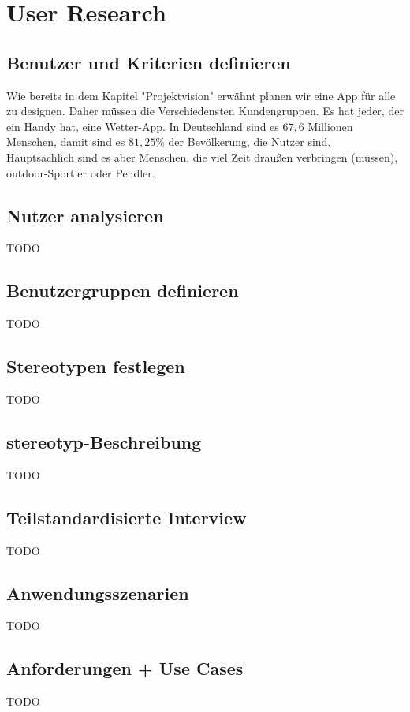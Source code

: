 \documentclass[12pt,a4paper]{scrartcl}
\begin{document}
\section{User Research}
\subsection{Benutzer und Kriterien definieren}

Wie bereits in dem Kapitel "Projektvision" erwähnt planen wir eine App für alle zu designen. Daher müssen die Verschiedensten Kundengruppen. Es hat jeder, der ein Handy hat, eine Wetter-App. In Deutschland sind es $67,6$ Millionen Menschen, damit sind es $81,25\%$ der Bevölkerung, die  Nutzer sind. \\
Hauptsächlich sind es aber Menschen, die viel Zeit draußen verbringen (müssen), outdoor-Sportler oder Pendler. 

\subsection{Nutzer analysieren}
TODO


\subsection{Benutzergruppen definieren}
TODO

\subsection{Stereotypen festlegen}
TODO

\subsection{stereotyp-Beschreibung}
TODO

\subsection{Teilstandardisierte Interview}
TODO

\subsection{Anwendungsszenarien}
TODO

\subsection{Anforderungen + Use Cases}
TODO



\end{document}
